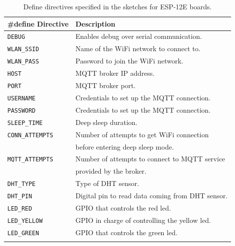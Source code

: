 \noindent\begin{minipage}{\textwidth}
\begingroup
\setlength{\LTleft}{-20cm plus -1fill}
\setlength{\LTright}{\LTleft}
	\begin{longtable}{l | l}
		\hline
		\textbf{\#define Directive} & \textbf{Description} \\
		\hline
		\hline
		\texttt{DEBUG} & Enables debug over serial communication. \\
		\hline
		\texttt{WLAN\_SSID} & Name of the WiFi network to connect to. \\
		\texttt{WLAN\_PASS} & Password to join the WiFi network. \\ 
		\hline
		\texttt{HOST} & MQTT broker IP address. \\
		\texttt{PORT} & MQTT broker port. \\
		\texttt{USERNAME} & Credentials to set up the MQTT connection. \\
		\texttt{PASSWORD} & Credentials to set up the MQTT connection. \\
		\hline
		\texttt{SLEEP\_TIME}    & Deep sleep duration. \\
		\texttt{CONN\_ATTEMPTS} & Number of attempts to get WiFi connection \\
					            & before entering deep sleep mode. \\
		\texttt{MQTT\_ATTEMPTS} & Number of attempts to connect to MQTT service \\
		                        & provided by the broker. \\
		\hline
		\texttt{DHT\_TYPE} & Type of DHT sensor. \\
		\texttt{DHT\_PIN}  & Digital pin to read data coming from DHT sensor. \\
		\hline
		\texttt{LED\_RED}    & GPIO that controls the red led. \\
		\texttt{LED\_YELLOW} & GPIO in charge of controlling the yellow led. \\
		\texttt{LED\_GREEN} & GPIO that controls the green led. \\
		\hline

	\caption{Define directives specified in the sketches for ESP-12E boards.}
	\label{esp12_code_defines}
	\end{longtable}
\endgroup
\end{minipage}

